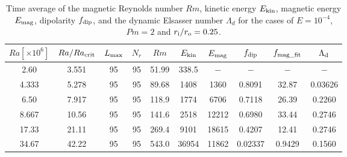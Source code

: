 \begin{table*}
{\color{red}
\caption{Time average of the magnetic Reynolds number $Rm$, kinetic energy $E_{\rm kin}$, magnetic energy $E_{\rm mag}$, dipolarity $f_{\rm dip}$, and the dynamic Elsasser number $\Lambda_{d}$ for the cases of $E = 10^{-4}$, $Pm = 2$ and $r_{\rm i}/r_{\rm o} = 0.25$.}
}
{\color{red}
  \begin{tabular}{cccccccccc}
    \hline
     $Ra[\times 10^6]$  &  $Ra/Ra_{\rm crit}$& 
     $L_{\rm max}$ & $N_{r}$ & $Rm$ 
     & $E_{\rm kin}$  &  $E_{\rm mag}$ & $f_{\rm dip}$ & $f_{\rm mag\_fit}$ & $\Lambda_{\rm d}$\\
    \hline
      2.60 & 3.551 & 95 & 95 & 51.99 & 338.5 & $-$ & $-$ & $-$ & $-$ \\
      4.333 & 5.278 & 95 & 95 & 89.68 & 1408 & 1360 & 0.8091 & 32.87 & 0.03626 \\
      6.50 & 7.917 & 95 & 95 & 118.9 & 1774 & 6706 & 0.7118 & 26.39 & 0.2260 \\
      8.667 & 10.56 & 95 & 95 & 141.6 & 2518 & 12212 & 0.6980 & 33.44 & 0.2746 \\
      17.33 & 21.11 & 95 & 95 & 269.4 & 9101 & 18615 & 0.4207 & 12.41 & 0.2746 \\
      34.67 & 42.22 & 95 & 95 & 543.0 & 36954 & 11862 & 0.02337 & 0.9429 & 0.1560 \\
    \hline
  \end{tabular}
 }
\label{table:Summary_25_Ek4}
\end{table*}